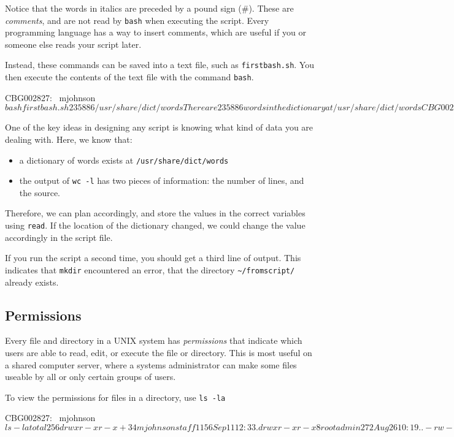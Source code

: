 \documentclass[11pt, oneside]{article}   	%
\newcounter{bash}
\begin{document}
Notice that the words in italics are preceded by a pound sign (\#).
These are \emph{comments}, and are not read by \verb+bash+ when executing the script.
Every programming language has a way to insert comments, which are useful if you or someone else reads your script later.

Instead, these commands can be saved into a text file, such as \verb+firstbash.sh+.
You then execute the contents of the text file with the command \verb+bash+.

\begin{Terminal}[caption=Executing a bash script,label=bashexe]
CBG002827:~ mjohnson$ bash firstbash.sh 
  235886 /usr/share/dict/words
There are 235886 words in the dictionary at /usr/share/dict/words
CBG002827:~ mjohnson$ 

\end{Terminal}
One of the key ideas in designing any script is knowing what kind of data you are dealing with.
Here, we know that:
\begin{itemize}
	\item a dictionary of words exists at \verb+/usr/share/dict/words+
	\item the output of \verb+wc -l+ has two pieces of information: the number of lines, and the source.
\end{itemize}
Therefore, we can plan accordingly, and store the values in the correct variables using \verb+read+.
If the location of the dictionary changed, we could change the value accordingly in the script file.

If you run the script a second time, you should get a third line of output.
This indicates that \verb+mkdir+ encountered an error, that the directory \verb+~/fromscript/+ already exists.

\subsection{Permissions}
Every file and directory in a UNIX system has \emph{permissions} that indicate which users are able to read, edit, or execute the file or directory.
This is most useful on a shared computer server, where a systems administrator can make some files useable by all or only certain groups of users.

To view the permissions for files in a directory, use \verb+ls -la+
\begin{Terminal}[caption=Viewing permissions,label=permissions]
CBG002827:~ mjohnson$ ls -la
total 256
drwxr-xr-x+  34 mjohnson  staff   1156 Sep 11 12:33 .
drwxr-xr-x    8 root      admin    272 Aug 26 10:19 ..
-rw-r--r--    1 mjohnson  staff   1048 Sep 11 10:08 first100words.txt
-rw-r--r--   1 mjohnson  staff    216 Sep 11 12:56 firstbash.sh
drwxr-xr-x    3 mjohnson  staff    102 Sep 11 12:24 fromscript
drwxr-xr-x    6 mjohnson  staff    204 Sep 11 12:17 myfirstdir
-rw-r--r--    1 mjohnson  staff  72223 Sep 11 12:37 usrbin.txt
CBG002827:~ mjohnson$ 
\end{Terminal}
\end{document}
